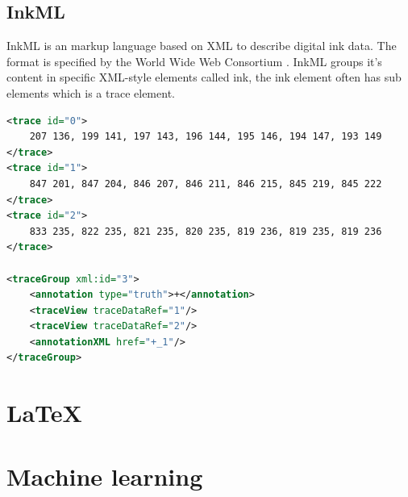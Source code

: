 \subsection{InkML}
InkML is an markup language based on XML to describe digital ink data. The format is specified by the World Wide Web Consortium \cite{chee_ink_2011}. InkML groups it's content in specific XML-style elements called ink, the ink element often has sub elements which is a trace element.\\

\begin{minipage}{\linewidth}
\begin{lstlisting}[language=XML, %
label={lst:InkML_ex},
caption={Example of three traces, each with an file-unique id. In addition to traces, we have listed a tracegroup, which specifies what and where the traces belong to. Truths are used when providing labels to use in supervised learning, which is explained later in this chapter.}]
<trace id="0">
    207 136, 199 141, 197 143, 196 144, 195 146, 194 147, 193 149
</trace>
<trace id="1">
    847 201, 847 204, 846 207, 846 211, 846 215, 845 219, 845 222
</trace>
<trace id="2">
    833 235, 822 235, 821 235, 820 235, 819 236, 819 235, 819 236
</trace>

<traceGroup xml:id="3">
	<annotation type="truth">+</annotation>
	<traceView traceDataRef="1"/>
	<traceView traceDataRef="2"/>
	<annotationXML href="+_1"/>
</traceGroup>
\end{lstlisting}
\end{minipage}


\section{\LaTeX}



\section{Machine learning}


% 


